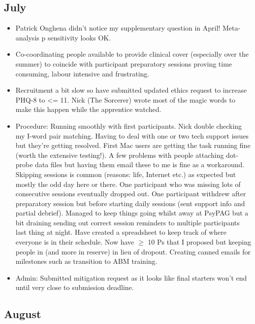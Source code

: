 \documentclass[british]{article}
\begin{document}
\subsection{July}

\begin{itemize}
  \item Patrick Onghena didn't notice my supplementary question in April!
  Meta-analysis p sensitivity looks OK.

  \item Co-coordinating people available to provide clinical cover
  (especially over the summer) to coincide with participant preparatory
  sessions proving time consuming, labour intensive and frustrating.

  \item Recruitment a bit slow so have submitted updated ethics request
  to increase PHQ-8 to <= 11. Nick (The Sorcerer) wrote most of the
  magic words to make this happen while the apprentice watched.

  \item Procedure: Running smoothly with first participants. Nick
  double checking my I-word pair matching. Having to deal with one or
  two tech support issues but they're getting resolved. First Mac users
  are getting the task running fine (worth the extensive testing!). A
  few problems with people attaching dot-probe data files but having them
  email these to me is fine as a workaround. Skipping sessions is common
  (reasons: life, Internet etc.) as expected but mostly the odd day here
  or there. One participant who was missing lots of consecutive sessions
  eventually dropped out. One participant withdrew after preparatory
  session but before starting daily sessions (sent support info and
  partial debrief). Managed to keep things going whilst away at PsyPAG
  but a bit draining sending out correct session reminders to multiple
  participants last thing at night. Have created a spreadsheet to keep
  track of where everyone is in their schedule. Now have ${\geq}$ 10 Ps
  that I proposed but keeping people in (and more in reserve) in lieu
  of dropout.  Creating canned emails for milestones such as transition
  to ABM training.

  \item Admin: Submitted mitigation request as it looks like final
  starters won't end until very close to submission deadline.

\end{itemize}

\subsection{August}
\end{document}
